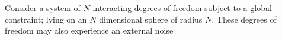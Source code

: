 Consider a system of $N$ interacting degrees of freedom subject to a global constraint; lying on an $N$ dimensional sphere of radius $N$. These degrees of freedom may also experience an external noise 